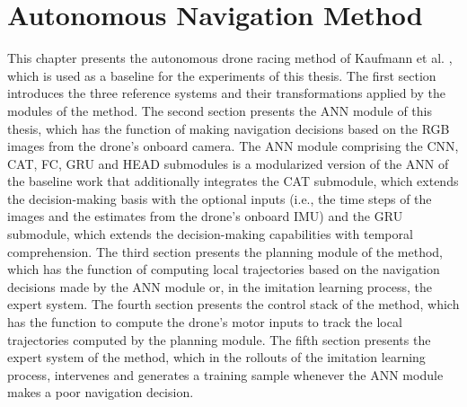 \chapter{Autonomous Navigation Method}
\label{mainone}


This chapter presents 
the autonomous drone racing method of Kaufmann et al. \cite{Kaufmann2018},
which is used as a baseline for the experiments of this thesis.
The first section introduces the three reference systems 
and their transformations applied by the modules of the method.
The second section presents the ANN module of this thesis,
which has the function of making navigation decisions 
based on the RGB images from the drone's onboard camera.
The ANN module comprising the CNN, CAT, FC, GRU and HEAD submodules
is a modularized version of the ANN of the baseline work
that additionally integrates the CAT submodule,
which extends the decision-making basis with the optional inputs
(i.e., the time steps of the images and 
the estimates from the drone's onboard IMU)
and the GRU submodule,
which extends the decision-making capabilities with temporal comprehension.
The third section presents the planning module of the method,
which has the function of computing local trajectories 
based on the navigation decisions made by
the ANN module or, in the imitation learning process, the expert system.
The fourth section presents the control stack of the method,
which has the function to compute the drone's motor inputs 
to track the local trajectories computed by the planning module.
The fifth section presents the expert system of the method,
which in the rollouts of the imitation learning process,
intervenes and generates a training sample
whenever the ANN module makes a poor navigation decision.



